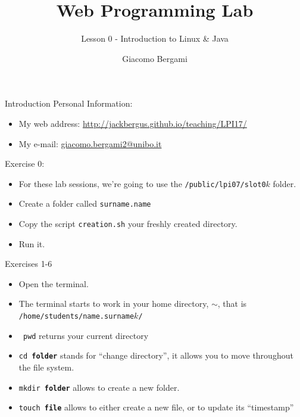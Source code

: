 \documentclass{beamer}
\title{Web Programming Lab}
\subtitle{Lesson 0 - Introduction to Linux \& Java}
\author{Giacomo Bergami}
\institute{University of Bologna}
\begin{document}
  \maketitle
  
    \begin{frame}{Introduction}
    Personal Information:
    \begin{itemize}
    	\item My web address: \url{http://jackbergus.github.io/teaching/LPI17/}
    	\item My e-mail: \href{mailto:giacomo.bergami2@unibo.it}{giacomo.bergami2@unibo.it}
    \end{itemize}
    
    Exercise 0:
  	\begin{itemize}
  		\item For these lab sessions, we're going to use the  \texttt{/public/lpi07/slot0$k$} folder.
  		\item Create a folder called \texttt{surname.name}
  		\item Copy the script \texttt{creation.sh} your freshly created directory.
  		\item Run it.
  	\end{itemize}
  \end{frame}
  
  \begin{frame}{Exercises 1-6}
    \begin{itemize}
    	\item Open the terminal. 
    	\item The terminal starts to work in your home directory, $\sim$, that is \texttt{/home/students/name.surname$k$/}
    	\item \texttt{\color{green} pwd} returns your current directory
    	\item \texttt{\color{green}cd \textbf{\color{red}folder}} stands for ``change directory'', it allows you to move throughout the file system.
    	\item \texttt{\color{green}mkdir \textbf{\color{red}folder}} allows to create a new folder.
    	\item \texttt{\color{green}touch \textbf{\color{red}file}} allows to either create a new file, or to update its ``timestamp''
    \end{itemize}
  \end{frame}
\end{document}
